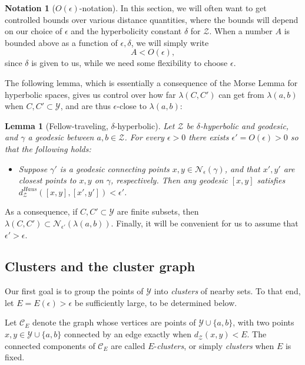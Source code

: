 \documentclass{amsart}
\newtheorem{lemma}[theorem]{Lemma}
\theoremstyle{definition}
\newtheorem{notation}[theorem]{Notation}
\theoremstyle{remark}
\theoremstyle{definition}
\newcommand{\calC}{\mathcal{C}}
\newcommand{\calN}{\mathcal{N}}
\newcommand{\calY}{\mathcal{Y}}
\newcommand{\calZ}{\mathcal{Z}}
\begin{document}
\begin{notation}[$O(\epsilon)$-notation]
In this section, we will often want to get controlled bounds over various distance quantities, where the bounds will depend on our choice of $\epsilon$ and the hyperbolicity constant $\delta$ for $\calZ$.  When a number $A$ is bounded above as a function of $\epsilon, \delta$, we will simply write 
$$A < O(\epsilon),$$
since $\delta$ is given to us, while we need some flexibility to choose $\epsilon$.
\end{notation}

The following lemma, which is essentially a consequence of the Morse Lemma for hyperbolic spaces, gives us control over how far $\lambda(C,C')$ can get from $\lambda(a,b)$ when $C, C' \subset \calY$, and are thus $\epsilon$-close to $\lambda(a,b)$:

\begin{lemma}[Fellow-traveling, $\delta$-hyperbolic]\label{lem:Morse close}
Let $\calZ$ be $\delta$-hyperbolic and geodesic, and $\gamma$ a geodesic between $a,b \in \calZ$.  For every $\epsilon>0$ there exists $\epsilon'=O(\epsilon)>0$ so that the following holds:

\begin{itemize}
\item Suppose $\gamma'$ is a geodesic connecting points $x,y \in \calN_{\epsilon}(\gamma)$, and that $x',y'$ are closest points to $x,y$ on $\gamma$, respectively.  Then any geodesic $[x,y]$ satisfies $d_{\calZ}^{Haus}([x,y], [x',y']) < \epsilon'$.
\end{itemize}
\end{lemma}

As a consequence, if $C, C' \subset \calY$ are finite subsets, then $\lambda(C,C') \subset \calN_{\epsilon'}(\lambda(a,b))$.  Finally, it will be convenient for us to assume that $\epsilon' > \epsilon$.



  
\subsection{Clusters and the cluster graph} \label{subsec:clusters}

Our first goal is to group the points of $\calY$ into \emph{clusters} of nearby sets.  To that end, let $E = E(\epsilon)> \epsilon$ be sufficiently large, to be determined below.

Let $\calC_E$ denote the graph whose vertices are points of $\calY \cup \{a,b\}$, with two points $x,y \in \calY \cup \{a,b\}$ connected by an edge exactly when $d_{\calZ}(x,y) < E$.  The connected components of $\calC_E$ are called $E$-\emph{clusters}, or simply \emph{clusters} when $E$ is fixed.
\end{document}
